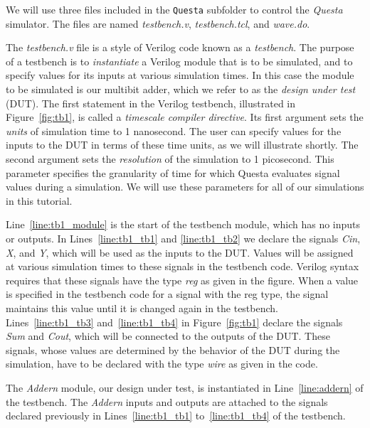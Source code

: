 \documentclass[11pt, twoside, pdftex]{article}
\begin{document}
\noindent
We will use three files included in the \texttt{Questa} subfolder to control the 
{\it Questa} simulator. The files are named {\it testbench.v}, {\it testbench.tcl}, and 
{\it wave.do}.

\noindent
The {\it testbench.v} file is a style of Verilog code known as a {\it testbench}. 
The purpose of a testbench is to {\it instantiate} a Verilog module that is to be simulated,
and to specify values for its inputs at various simulation times. In this case the module
to be simulated is our multibit adder, which we refer to as the {\it design under test} (DUT).
The first statement in the Verilog 
testbench, illustrated in Figure~\ref{fig:tb1}, is called a {\it timescale compiler directive}.
Its first argument sets the {\it units} of simulation time to 1 nanosecond. The user can
specify values for the inputs to the DUT in terms of these time units, as we will illustrate
shortly. The second argument sets the {\it resolution} of the simulation to 1 picosecond.
This parameter specifies the granularity of time for which Questa evaluates signal values
during a simulation. We will use these parameters for all of our simulations in this tutorial.

\noindent
Line~\ref{line:tb1_module} is the start of the testbench module, which has no inputs or
outputs. In Lines~\ref{line:tb1_tb1} and \ref{line:tb1_tb2} we declare the signals {\it Cin}, 
{\it X}, and {\it Y}, which will be used as the inputs to the DUT. Values will be assigned 
at various simulation times to these signals in the testbench code. Verilog syntax requires
that these signals have the type {\it reg} as given in the figure.  When a value is 
specified in the testbench code for a signal with the reg type, the signal maintains this 
value until it is changed again in the testbench.  Lines~\ref{line:tb1_tb3} 
and~\ref{line:tb1_tb4} in Figure~\ref{fig:tb1} declare the signals {\it Sum} and
{\it Cout}, which will be connected to the outputs of the DUT. These signals, 
whose values are determined by the behavior of the DUT during the simulation, have to be 
declared with the type {\it wire} as given in the code.

\noindent
The {\it Addern} module, our design under test, is instantiated in Line~\ref{line:addern} of the 
testbench. The {\it Addern} inputs and outputs are attached to the signals declared previously
in Lines~\ref{line:tb1_tb1} to~\ref{line:tb1_tb4} of the testbench.
\end{document}
